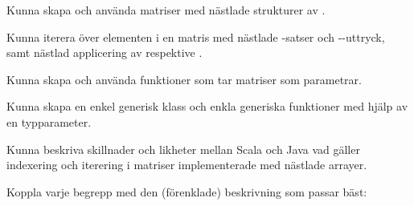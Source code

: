 

\ifPreSolution

\Exercise{\ExeWeekEIGHT}\label{exe:W08}

\begin{Goals}
\item Kunna skapa och använda matriser med nästlade strukturer av .
\item Kunna iterera över elementen i en matris med nästlade -satser och --uttryck, samt nästlad applicering av  respektive .
\item Kunna skapa och använda funktioner som tar matriser som parametrar.
\item Kunna skapa en enkel generisk klass och enkla generiska funktioner med hjälp av en typparameter.
\item Kunna beskriva skillnader och likheter mellan Scala och Java vad gäller indexering och iterering i matriser implementerade med nästlade arrayer.
\end{Goals}

\begin{Preparations}
\item {}
\end{Preparations}

\BasicTasks

\else

\ExerciseSolution{\ExeWeekEIGHT}

\BasicTasks

\fi




\QUESTBEGIN

\Task \what

\vspace{1em}\noindent Koppla varje begrepp med den (förenklade) beskrivning som passar bäst:

\begin{ConceptConnections}

\end{ConceptConnections}

\SOLUTION

